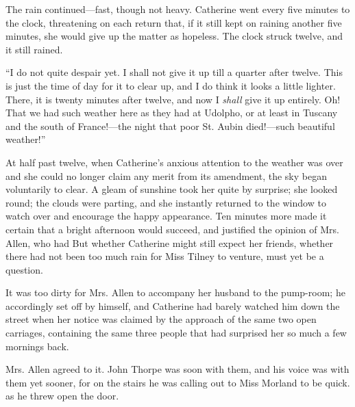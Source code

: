 The rain continued---fast, though not heavy. Catherine went every five minutes to the clock, threatening on each return that, if it still kept on raining another five minutes, she would give up the matter as hopeless. The clock struck twelve, and it still rained. 

“I do not quite despair yet. I shall not give it up till a quarter after twelve. This is just the time of day for it to clear up, and I do think it looks a little lighter. There, it is twenty minutes after twelve, and now I {\em shall} give it up entirely. Oh! That we had such weather here as they had at Udolpho, or at least in Tuscany and the south of France!---the night that poor St. Aubin died!---such beautiful weather!”

At half past twelve, when Catherine's anxious attention to the weather was over and she could no longer claim any merit from its amendment, the sky began voluntarily to clear. A gleam of sunshine took her quite by surprise; she looked round; the clouds were parting, and she instantly returned to the window to watch over and encourage the happy appearance. Ten minutes more made it certain that a bright afternoon would succeed, and justified the opinion of Mrs. Allen, who had  But whether Catherine might still expect her friends, whether there had not been too much rain for Miss Tilney to venture, must yet be a question.

It was too dirty for Mrs. Allen to accompany her husband to the pump-room; he accordingly set off by himself, and Catherine had barely watched him down the street when her notice was claimed by the approach of the same two open carriages, containing the same three people that had surprised her so much a few mornings back.

 Mrs. Allen agreed to it. John Thorpe was soon with them, and his voice was with them yet sooner, for on the stairs he was calling out to Miss Morland to be quick.  as he threw open the door. 

